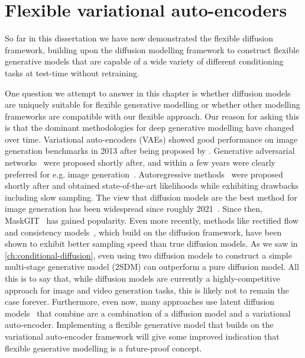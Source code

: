 \chapter{Flexible variational auto-encoders}
\label{ch:cigcvae}

So far in this dissertation we have now demonstrated the flexible diffusion framework, building upon the diffusion modelling framework to construct flexible generative models that are capable of a wide variety of different conditioning tasks at test-time without retraining.

One question we attempt to answer in this chapter is whether diffusion models are uniquely suitable for flexible generative modelling or whether other modelling frameworks are compatible with our flexible approach. Our reason for asking this is that the dominant methodologies for deep generative modelling have changed over time. Variational auto-encoders (VAEs) showed good performance on image generation benchmarks in 2013 after being proposed by \citet{kingma2013auto}. Generative adversarial networks~\citep{goodfellow2014generative} were proposed shortly after, and within a few years were clearly preferred for e.g. image generation~\citep{karras2018style}. Autoregressive methods~\citep{van2016pixel} were proposed shortly after and obtained state-of-the-art likelihoods while exhibiting drawbacks including slow sampling. The view that diffusion models are the best method for image generation has been widespread since roughly 2021~\citep{dhariwal2021diffusion}. Since then, MaskGIT~\citep{chang2022maskgit} has gained popularity. Even more recently, methods like rectified flow~\citep{esser2024scaling} and consistency models~\citep{song2023consistency}, which build on the diffusion framework, have been shown to exhibit better sampling speed than true diffusion models. As we saw in \cref{ch:conditional-diffusion}, even using two diffusion models to construct a simple multi-stage generative model (2SDM) can outperform a pure diffusion model. All this is to say that, while diffusion models are currently a highly-competitive approach for image and video generation tasks, this is likely not to remain the case forever. Furthermore, even now, many approaches use latent diffusion models~\citep{rombach2022high} that combine are a combination of a diffusion model and a variational auto-encoder. Implementing a flexible generative model that builds on the variational auto-encoder framework will give some improved indication that flexible generative modelling is a future-proof concept.

